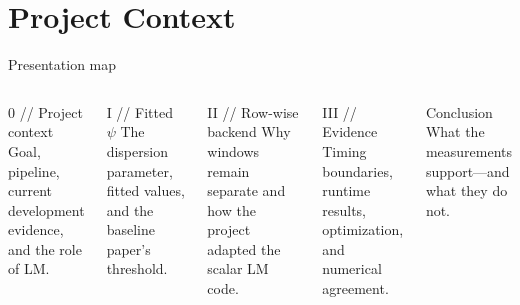 \documentclass[aspectratio=169,10pt]{beamer}
\begin{document}
\section{Project Context}

\begin{frame}{Presentation map}
\begin{columns}[T,onlytextwidth]
\begin{block}{0 // Project context}
Goal, pipeline, current development evidence, and the role of LM.
\end{block}
\begin{block}{I // Fitted \(\psi\)}
The dispersion parameter, fitted values, and the baseline paper's threshold.
\end{block}

\begin{block}{II // Row-wise backend}
Why windows remain separate and how the project adapted the scalar LM code.
\end{block}
\begin{block}{III // Evidence}
Timing boundaries, runtime results, optimization, and numerical agreement.
\end{block}
\begin{exampleblock}{Conclusion}
What the measurements support---and what they do not.
\end{exampleblock}
\end{columns}
\end{frame}
\end{document}
